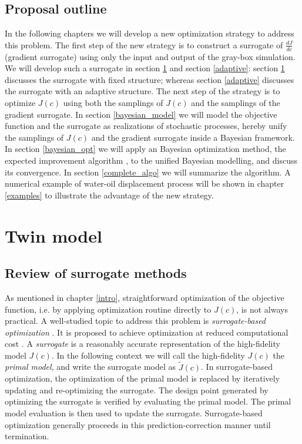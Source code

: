 \documentclass[a4paper,onecolumn]{article}
\theoremstyle{remark}
\begin{document}
\subsection{Proposal outline}
\noindent In the following chapters we will develop a new optimization strategy to address this
problem. 
The first step of the new strategy is to construct a surrogate of $\frac{dJ}{dc}$ 
(gradient surrogate) using only the input and output of the
gray-box simulation. We will develop such a surrogate in section \ref{gradient_surrogate} and section \ref{adaptive}:
section \ref{gradient_surrogate} discusses the surrogate with fixed structure; whereas section \ref{adaptive} discusses the surrogate
with an adaptive structure. The next step of the strategy is to optimize $J(c)$ using both the
samplings of $J(c)$ and the samplings of the gradient surrogate.
In section \ref{bayesian_model} we will model the objective function and the surrogate as
realizations of stochastic processes, hereby
unify the samplings of $J(c)$ and the gradient surrogate inside a Bayesian framework. In section \ref{bayesian_opt} we will apply an Bayesian optimization method, 
the expected improvement algorithm \cite{jones1998},
to the unified Bayesian modelling, and discuss its convergence. In section \ref{complete_algo} we will summarize the algorithm. A numerical example of water-oil displacement process will be shown in chapter \ref{examples} to illustrate the advantage of the new strategy.\\

\newpage
\section{Twin model}
\label{gradient_surrogate}
\subsection{Review of surrogate methods}
\label{review surrogate methods}
\noindent As mentioned in chapter \ref{intro}, 
straightforward optimization of the objective function, i.e. by applying
optimization routine directly to $J(c)$, is not always practical.
A well-studied topic to address this problem is \emph{surrogate-based optimization}
\cite{Opt Koziel Book, Surrogate based analysis and optimization}.
It is proposed to achieve optimization at reduced computational cost \cite{Space mapping 1}.
A \emph{surrogate} is a reasonably accurate representation of the high-fidelity model $J(c)$.
In the following context we will call the high-fidelity $J(c)$ the \emph{primal model},
and write the surrogate model as $\tilde{J}(c)$.
In surrogate-based optimization, the optimization of the primal model is
replaced by iteratively updating and re-optimizing the surrogate.
The design point generated by optimizing the surrogate is verified by evaluating
the primal model. The primal model evaluation is then used to update the surrogate.
Surrogate-based optimization generally proceeds in this prediction-correction manner until
termination.\\
\end{document}
